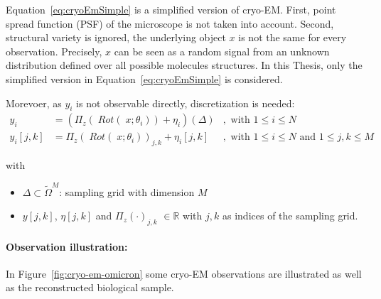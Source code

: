 Equation~\ref{eq:cryoEmSimple} is a simplified version of cryo-EM.
First, point spread function (PSF) of the microscope is not taken into account.
Second, structural variety is ignored, the underlying object $x$ is not the same 
for every observation. 
Precisely, $x$ can be seen as a random signal from an unknown distribution defined over all possible molecules structures.
In this Thesis, only the simplified version in Equation~\ref{eq:cryoEmSimple} is considered.


Morevoer, as $y_i$ is not observable directly, discretization is needed:
\begin{equation}
    \label{eq:cryoEmSimpleDiscrete}
    \begin{aligned}
        y_i &= \left( \Pi_z (\; Rot (\;x; \theta_i)) + \eta_i\right)(\Delta) &, \text{ with } 1 \leq i \leq N \\
        y_i[j,k] &= \Pi_z (\; Rot(\;x; \theta_i))_{j,k} + \eta_i[j,k] &, \text{ with } 1 \leq i \leq N \text{ and } 1 \leq j,k \leq M
    \end{aligned}
\end{equation}

with
\begin{itemize}
    \item $\Delta \subset \tilde{\Omega}^{M}$: sampling grid with dimension $M$
    \item $y[j,k]$, $\eta[j,k]$ and $\Pi_z(\cdot)_{j,k}$ $ \in \mathbb{R}$ with $j,k$ as indices of the sampling grid.
\end{itemize}


\paragraph{Observation illustration:}
In Figure~\ref{fig:cryo-em-omicron} some cryo-EM observations are illustrated as well as the reconstructed biological sample.


